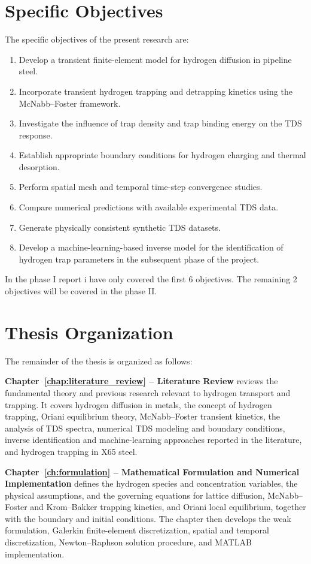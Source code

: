 \documentclass[a4paper,12pt,oneside]{report}
\begin{document}
\section{Specific Objectives}

The specific objectives of the present research are:

\begin{enumerate}
    \item Develop a transient finite-element model for hydrogen diffusion in pipeline steel.
    \item Incorporate transient hydrogen trapping and detrapping kinetics using the McNabb--Foster framework.
    \item Investigate the influence of trap density and trap binding energy on the TDS response.
    \item Establish appropriate boundary conditions for hydrogen charging and thermal desorption.
    \item Perform spatial mesh and temporal time-step convergence studies.
    \item Compare numerical predictions with available experimental TDS data.
    \item Generate physically consistent synthetic TDS datasets.
    \item Develop a machine-learning-based inverse model for the identification of hydrogen trap parameters in the subsequent phase of the project.
\end{enumerate}

In the phase I report i have only covered the first 6 objectives. The remaining 2 objectives will be covered in the phase II.


\section{Thesis Organization}

The remainder of the thesis is organized as follows:

\textbf{Chapter~\ref{chap:literature_review} -- Literature Review} reviews the fundamental theory and previous research relevant to hydrogen transport and trapping. It covers hydrogen diffusion in metals, the concept of hydrogen trapping, Oriani equilibrium theory, McNabb--Foster transient kinetics, the analysis of TDS spectra, numerical TDS modeling and boundary conditions, inverse identification and machine-learning approaches reported in the literature, and hydrogen trapping in X65 steel.

\textbf{Chapter~\ref{ch:formulation} -- Mathematical Formulation and Numerical Implementation} defines the hydrogen species and concentration variables, the physical assumptions, and the governing equations for lattice diffusion, McNabb--Foster and Krom--Bakker trapping kinetics, and Oriani local equilibrium, together with the boundary and initial conditions. The chapter then develops the weak formulation, Galerkin finite-element discretization, spatial and temporal discretization, Newton--Raphson solution procedure, and MATLAB implementation.
\end{document}
